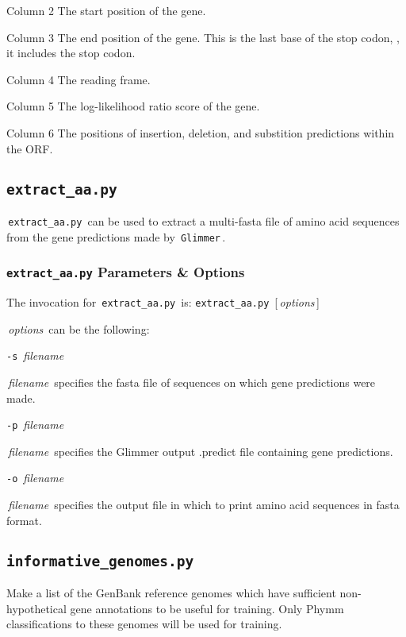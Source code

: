 \documentclass[fleqn,titlepage,11pt]{article}
\def\Desc#1{\,\mbox{\emph{#1}}\,}
\def\Pg#1{\texttt{#1}}
\begin{document}
\item[Column 2]
  The start position of the gene.

\item[Column 3]
  The end position of the gene.  This is the last base of the stop codon, \ie,
  it includes the stop codon.

\item[Column 4]
  The reading frame.

\item[Column 5]
  The log-likelihood ratio score of the gene.

\item[Column 6]
  The positions of insertion, deletion, and substition predictions within the ORF.
\el

\subsection{\Pg{extract\_aa.py}}
\,\Pg{extract\_aa.py}\, can be used to extract a multi-fasta file of
amino acid sequences from the gene predictions made by
\,\Pg{Glimmer}\,.

\subsubsection{\Pg{extract\_aa.py} Parameters \& Options}

The invocation for \,\Pg{extract\_aa.py}\, is:
\bq
  \Pg{extract\_aa.py}\, [\Desc{options}]
\eq

\Desc{options} can be the following:
\bl{}\RaggedRight

\exdent
  \verb`-s` \Desc{filename}

  \Desc{filename} specifies the fasta file of sequences on which
  gene predictions were made.

\exdent
  \verb`-p` \Desc{filename}

  \Desc{filename} specifies the Glimmer output .predict file
  containing gene predictions.

\exdent
  \verb`-o` \Desc{filename}

  \Desc{filename} specifies the output file in which to print
  amino acid sequences in fasta format.

\el

\subsection{\Pg{informative\_genomes.py}}

Make a list of the GenBank reference genomes which have sufficient
non-hypothetical gene annotations to be useful for training. Only
Phymm classifications to these genomes will be used for training.
\end{document}
